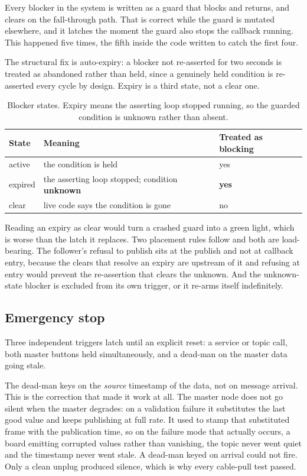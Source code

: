 Every blocker in the system is written as a guard that blocks and returns, and
clears on the fall-through path. That is correct while the guard is mutated
elsewhere, and it latches the moment the guard also stops the callback
running. This happened five times, the fifth inside the code written to catch
the first four.

The structural fix is auto-expiry: a blocker not re-asserted for two seconds
is treated as abandoned rather than held, since a genuinely held condition is
re-asserted every cycle by design. Expiry is a third state, not a clear one.

\begin{table}[htbp]
  \centering
  \caption{Blocker states. Expiry means the asserting loop stopped running, so
  the guarded condition is unknown rather than absent.}
  \label{tab:blockstates}
  \begin{tabular}{@{}lll@{}}
    \toprule
    State & Meaning & Treated as blocking \\
    \midrule
    active  & the condition is held & yes \\
    expired & the asserting loop stopped; condition \textbf{unknown} & \textbf{yes} \\
    clear   & live code says the condition is gone & no \\
    \bottomrule
  \end{tabular}
\end{table}

Reading an expiry as clear would turn a crashed guard into a green light,
which is worse than the latch it replaces. Two placement rules follow and both
are load-bearing. The follower's refusal to publish sits at the publish and
not at callback entry, because the clears that resolve an expiry are upstream
of it and refusing at entry would prevent the re-assertion that clears the
unknown. And the unknown-state blocker is excluded from its own trigger, or it
re-arms itself indefinitely.

\subsection{Emergency stop}

Three independent triggers latch until an explicit reset: a service or topic
call, both master buttons held simultaneously, and a dead-man on the master
data going stale.

The dead-man keys on the \emph{source} timestamp of the data, not on message
arrival. This is the correction that made it work at all. The master node does
not go silent when the master degrades: on a validation failure it substitutes
the last good value and keeps publishing at full rate. It used to stamp that
substituted frame with the publication time, so on the failure mode that
actually occurs, a board emitting corrupted values rather than vanishing, the
topic never went quiet and the timestamp never went stale. A dead-man keyed on
arrival could not fire. Only a clean unplug produced silence, which is why
every cable-pull test passed.

